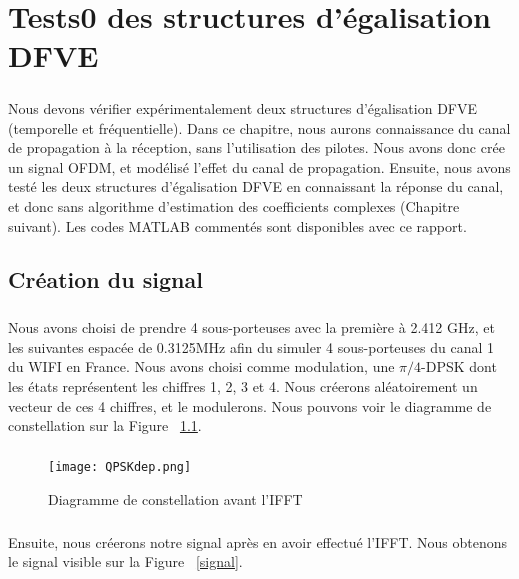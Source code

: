 \chapter{Tests0 des structures d'égalisation DFVE}

\paragraph{}
Nous devons vérifier expérimentalement deux structures d'égalisation DFVE
(temporelle et fréquentielle). Dans ce chapitre, nous aurons connaissance du
canal de propagation à la réception, sans l'utilisation des pilotes. Nous avons
donc crée un signal OFDM, et modélisé l'effet du canal de propagation. Ensuite,
nous avons testé les deux structures d'égalisation DFVE en connaissant la
réponse du canal, et donc sans algorithme d'estimation des coefficients
complexes (Chapitre suivant). Les codes MATLAB commentés sont disponibles avec ce
rapport.

\section{Création du signal}

\paragraph{}
Nous avons choisi de prendre 4 sous-porteuses avec la première à 2.412 GHz, et
les suivantes espacée de 0.3125MHz afin du simuler 4 sous-porteuses du canal 1
du WIFI en France. Nous avons choisi comme modulation, une $\pi/4$-DPSK dont les
états représentent les chiffres 1, 2, 3 et 4. Nous créerons aléatoirement
un vecteur de ces 4 chiffres, et le modulerons. Nous pouvons voir le diagramme de
constellation sur la Figure ~\ref{QPSK}.

\paragraph{}
\vspace{1\baselineskip}
\begin{figure}[!h]
  \centering
  \texttt{[image: QPSKdep.png]}
  \caption{Diagramme de constellation avant l'IFFT }
	\label{QPSK}
\end{figure}
\vspace{10\baselineskip}

\paragraph{}
Ensuite, nous créerons notre signal après en avoir effectué l'IFFT. Nous obtenons le signal visible sur la Figure ~\ref{signal}.

